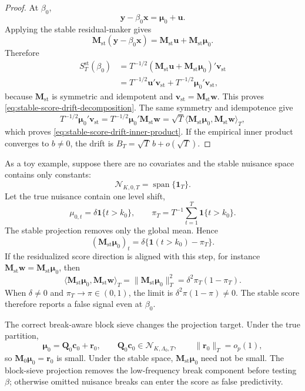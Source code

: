 \documentclass[12pt]{article}
\numberwithin{equation}{section}
\theoremstyle{definition}
\newcommand{\ind}{\mathbf 1}
\newcommand{\N}{\mathcal N}
\newcommand{\innerT}[2]{\langle #1,#2\rangle_T}
\begin{document}
\begin{proof}
At \(\beta_0\),
\[
    \bm y-\beta_0\bm x=\bm\mu_0+\bm u.
\]
Applying the stable residual-maker gives
\[
    \bm M_{\mathrm{st}}(\bm y-\beta_0\bm x)
    =
    \bm M_{\mathrm{st}}\bm u
    +
    \bm M_{\mathrm{st}}\bm\mu_0.
\]
Therefore
\[
\begin{aligned}
    S_T^{\mathrm{st}}(\beta_0)
    &=
    T^{-1/2}
    (\bm M_{\mathrm{st}}\bm u+\bm M_{\mathrm{st}}\bm\mu_0)'
    \bm v_{\mathrm{st}}  \\
    &=
    T^{-1/2}\bm u'\bm v_{\mathrm{st}}
    +
    T^{-1/2}\bm\mu_0'\bm v_{\mathrm{st}},
\end{aligned}
\]
because \(\bm M_{\mathrm{st}}\) is symmetric and idempotent and
\(\bm v_{\mathrm{st}}=\bm M_{\mathrm{st}}\bm w\). This proves
\eqref{eq:stable-score-drift-decomposition}. The same symmetry and idempotence
give
\[
    T^{-1/2}\bm\mu_0'\bm v_{\mathrm{st}}
    =
    T^{-1/2}\bm\mu_0'\bm M_{\mathrm{st}}\bm w
    =
    \sqrt T
    \innerT{\bm M_{\mathrm{st}}\bm\mu_0}
           {\bm M_{\mathrm{st}}\bm w},
\]
which proves \eqref{eq:stable-score-drift-inner-product}. If the empirical
inner product converges to \(b\ne0\), the drift is \(B_T=\sqrt T\,b+o(\sqrt T)\).
\end{proof}

As a toy example, suppose there are no covariates and the stable nuisance space
contains only constants:
\[
    \N_{K,0,T}=\operatorname{span}\{\bm 1_T\}.
\]
Let the true nuisance contain one level shift,
\[
    \mu_{0,t}=\delta\ind\{t>k_0\},
    \qquad
    \pi_T=T^{-1}\sum_{t=1}^T\ind\{t>k_0\}.
\]
The stable projection removes only the global mean. Hence
\[
    (\bm M_{\mathrm{st}}\bm\mu_0)_t
    =
    \delta\{\ind(t>k_0)-\pi_T\}.
\]
If the residualized score direction is aligned with this step, for instance
\(\bm M_{\mathrm{st}}\bm w=\bm M_{\mathrm{st}}\bm\mu_0\), then
\[
    \innerT{\bm M_{\mathrm{st}}\bm\mu_0}
           {\bm M_{\mathrm{st}}\bm w}
    =
    \|\bm M_{\mathrm{st}}\bm\mu_0\|_T^2
    =
    \delta^2\pi_T(1-\pi_T).
\]
When \(\delta\ne0\) and \(\pi_T\to\pi\in(0,1)\), the limit is
\(\delta^2\pi(1-\pi)\ne0\). The stable score therefore reports a false signal
even at \(\beta_0\).

The correct break-aware block sieve changes the projection target. Under the
true partition,
\[
    \bm\mu_0=\bm Q_0\bm c_0+\bm r_0,
    \qquad
    \bm Q_0\bm c_0\in\N_{K,\Lambda_0,T},
    \qquad
    \|\bm r_0\|_T=o_p(1),
\]
so \(\bm M_0\bm\mu_0=\bm r_0\) is small. Under the stable space,
\(\bm M_{\mathrm{st}}\bm\mu_0\) need not be small. The block-sieve projection
removes the low-frequency break component before testing \(\beta\); otherwise
omitted nuisance breaks can enter the score as false predictivity.
\end{document}
